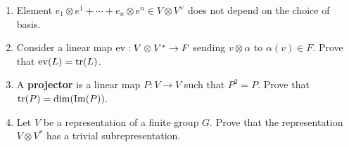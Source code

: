 \documentclass[../psets.tex]{subfiles}
\begin{document}
\begin{enumerate}
    \begin{enumerate}
        \item Element $e_1\otimes e^1+\cdots+e_n\otimes e^n\in V\otimes V^\vee$ does not depend on the choice of basis.
        \item Consider a linear map $\operatorname{ev}:V\otimes V^*\to F$ sending $v\otimes\alpha$ to $\alpha(v)\in F$. Prove that $\operatorname{ev}(L)=\tr(L)$.
        \item A \textbf{projector} is a linear map $P:V\to V$ such that $P^2=P$. Prove that $\tr(P)=\dim(\operatorname{Im}(P))$.
        \item Let $V$ be a representation of a finite group $G$. Prove that the representation $V\otimes V^*$ has a trivial subrepresentation.
    \end{enumerate}
\end{enumerate}
\end{document}

